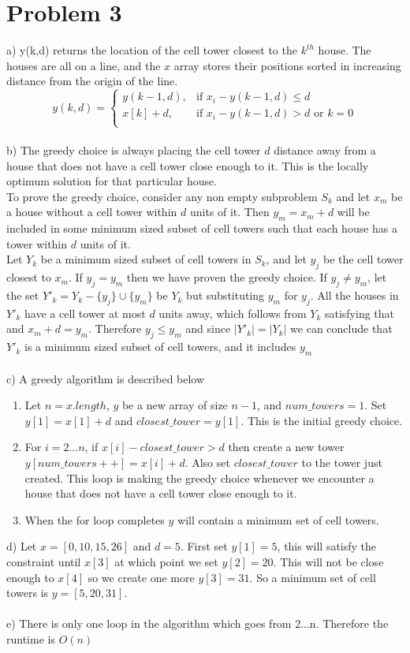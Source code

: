\documentclass{article}
\begin{document}
\section*{Problem 3}
a) y(k,d) returns the location of the cell tower closest to the $k^{th}$ house.  The houses are all on a line, and the $x$ array stores their positions sorted in increasing distance from the origin of the line.
\[
    y(k,d)= 
\begin{cases}
    y(k-1,d),& \text{if } x_i-y(k-1,d)\leq d\\
    x[k]+d,& \text{if } x_i-y(k-1,d)> d \text{ or } k=0\\
\end{cases}
\]\\
b) The greedy choice is always placing the cell tower $d$ distance away from a house that does not have a cell tower close enough to it.  This is the locally optimum solution for that particular house.\\
To prove the greedy choice, consider any non empty subproblem $S_k$ and let $x_m$ be a house without a cell tower within $d$ units of it.  Then $y_m = x_m + d$ will be included in some minimum sized subset of cell towers such that each house has a tower within $d$ units of it.\\
Let $Y_k$ be a minimum sized subset of cell towers in $S_k$, and let $y_j$ be the cell tower closest to $x_m$.  If $y_j=y_m$ then we have proven the greedy choice.  If $y_j\neq y_m$, let the set $Y'_k = Y_k - \{y_j\} \cup \{y_m\}$ be $Y_k$ but substituting $y_m$ for $y_j$. All the houses in $Y'_k$ have a cell tower at most $d$ units away, which follows from $Y_k$ satisfying that and $x_m + d = y_m$.  Therefore $y_j \leq y_m$ and since $|Y'_k|=|Y_k|$ we can conclude that $Y'_k$ is a minimum sized subset of cell towers, and it includes $y_m$\\\\
c) A greedy algorithm is described below
\begin{enumerate}
  \item Let $n=x.length$, $y$ be a new array of size $n-1$, and $num\_towers = 1$.  Set $y[1] = x[1] + d$ and $closest\_tower = y[1]$.  This is the initial greedy choice.
  \item For $i = 2...n$, if $x[i] - closest\_tower > d$ then create a new tower $y[num\_towers++] = x[i] + d$. Also set $closest\_tower$ to the tower just created. This loop is making the greedy choice whenever we encounter a house that does not have a cell tower close enough to it.
  \item When the for loop completes $y$ will contain a minimum set of cell towers.
\end{enumerate}
d) Let $x = [0, 10, 15, 26]$ and $d=5$.  First set $y[1] = 5$, this will satisfy the constraint until $x[3]$ at which point we set $y[2] = 20$.  This will not be close enough to $x[4]$ so we create one more $y[3] = 31$.  So a minimum set of cell towers is $y = [5, 20, 31]$.\\\\
e) There is only one loop in the algorithm which goes from 2...n.  Therefore the runtime is $O(n)$
\end{document}
